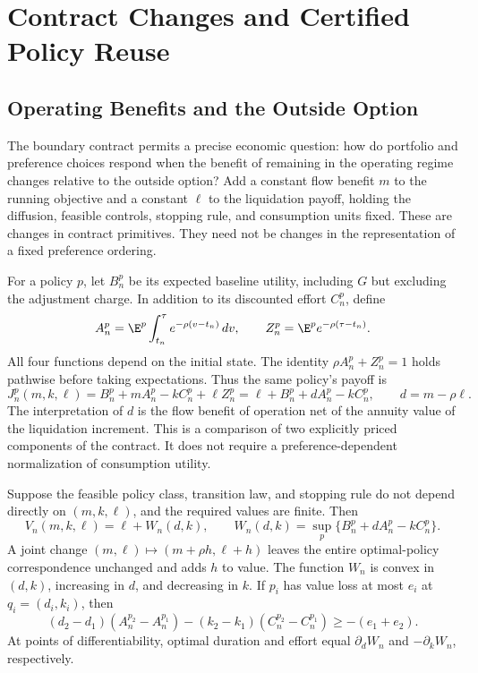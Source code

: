 \section{Contract Changes and Certified Policy Reuse}
\label{sec:contracts}
\subsection{Operating Benefits and the Outside Option}
The boundary contract permits a precise economic question: how do portfolio and preference choices respond when the benefit of remaining in the operating regime changes relative to the outside option? Add a constant flow benefit $m$ to the running objective and a constant $\ell$ to the liquidation payoff, holding the diffusion, feasible controls, stopping rule, and consumption units fixed. These are changes in contract primitives. They need not be changes in the representation of a fixed preference ordering.

For a policy $p$, let $B_n^p$ be its expected baseline utility, including $G$ but excluding the adjustment charge. In addition to its discounted effort $C_n^p$, define
\begin{equation}
 A_n^p=\E^p\int_{t_n}^{\tau}e^{-\rho(v-t_n)}\,dv,
 \qquad Z_n^p=\E^p e^{-\rho(\tau-t_n)}.
 \label{eq:duration_exposure}
\end{equation}
All four functions depend on the initial state. The identity $\rho A_n^p+Z_n^p=1$ holds pathwise before taking expectations. Thus the same policy's payoff is
\begin{equation}
 J_n^p(m,k,\ell)=B_n^p+m A_n^p-kC_n^p+\ell Z_n^p
 =\ell+B_n^p+dA_n^p-kC_n^p,\qquad d=m-\rho\ell.
 \label{eq:contract_quotient}
\end{equation}
The interpretation of $d$ is the flow benefit of operation net of the annuity value of the liquidation increment. This is a comparison of two explicitly priced components of the contract. It does not require a preference-dependent normalization of consumption utility.

\begin{proposition}
\label{thm:contract}
Suppose the feasible policy class, transition law, and stopping rule do not depend directly on $(m,k,\ell)$, and the required values are finite. Then
\begin{equation}
 V_n(m,k,\ell)=\ell+W_n(d,k),\qquad
 W_n(d,k)=\sup_p\{B_n^p+dA_n^p-kC_n^p\}.
 \label{eq:contract_value}
\end{equation}
A joint change $(m,\ell)\mapsto(m+\rho h,\ell+h)$ leaves the entire optimal-policy correspondence unchanged and adds $h$ to value. The function $W_n$ is convex in $(d,k)$, increasing in $d$, and decreasing in $k$. If $p_i$ has value loss at most $e_i$ at $q_i=(d_i,k_i)$, then
\begin{equation}
 (d_2-d_1)(A^{p_2}_n-A^{p_1}_n)
 -(k_2-k_1)(C^{p_2}_n-C^{p_1}_n)\geq-(e_1+e_2).
 \label{eq:joint_moment}
\end{equation}
At points of differentiability, optimal duration and effort equal $\partial_dW_n$ and $-\partial_kW_n$, respectively.
\end{proposition}

